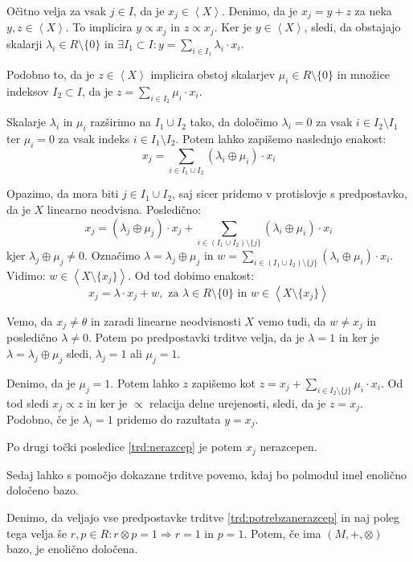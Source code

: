 \documentclass[mat1]{fmfdelo}
\newcommand{\Gen}[1]{\ensuremath{\left<{#1}\right>}}
\begin{document}
\begin{dokaz}
	Očitno velja za vsak $j\in I$, da je $x_j\in\Gen{X}$. Denimo, da je $x_j = y + z$ za neka $y, z\in\Gen{X}$. To implicira $y\varpropto x_j$ in $z\varpropto x_j$. 
	Ker je $y\in\Gen{X}$, sledi, da obstajajo skalarji $\lambda_i\in R\setminus\{0\}$ in $\exists I_1 \subset I: y = \sum_{i \in I_1}\lambda_i\cdot x_i$. 
	
	Podobno to, da je $z\in\Gen{X}$ implicira obstoj skalarjev $\mu_i\in R\setminus\{0\}$ in množice indeksov $I_2\subset I$, da je $z = \sum_{i\in I_2}\mu_i\cdot x_i$. 
	
	Skalarje $\lambda_i$ in $\mu_i$ razširimo na $I_1\cup I_2$ tako, da določimo $\lambda_i = 0$ za vsak $i\in I_2\setminus I_1$ ter $\mu_i = 0$ za vsak indeks $i\in I_1\setminus I_2$. Potem lahko zapišemo naslednjo enakost: $$x_j = \sum_{i\in I_1\cup I_2}(\lambda_i \oplus\mu_i)\cdot x_i$$
	
	Opazimo, da mora biti $j\in I_1\cup I_2$, saj sicer pridemo v protislovje s predpostavko, da je $X$ linearno neodvisna. Posledično: $$ x_j = (\lambda_j\oplus\mu_j)\cdot x_j + \sum_{i\in (I_1\cup I_2)\setminus\{j\}}(\lambda_i\oplus\mu_i)\cdot x_i $$
	kjer $\lambda_j\oplus\mu_j\neq 0$. Označimo $\lambda = \lambda_j\oplus\mu_j$ in $w = \sum_{i\in (I_1\cup I_2)\setminus\{j\}}(\lambda_i\oplus\mu_i)\cdot x_i$. Vidimo: $w\in\Gen{X\setminus\{x_j\}}$. Od tod dobimo enakost: $$x_j = \lambda\cdot x_j + w,\text{~za~} \lambda\in R\setminus\{0\}\text{~in~} w\in\Gen{X\setminus\{x_j\}} $$
	
	Vemo, da $x_j\neq \theta$ in zaradi linearne neodvisnosti $X$ vemo tudi, da $w\neq x_j$ in posledično $\lambda\neq 0$. Potem po predpostavki trditve velja, da je $\lambda = 1$ in ker je $\lambda = \lambda_j\oplus\mu_j$ sledi, $\lambda_j = 1$ ali $\mu_j = 1$. 
	
	Denimo, da je $\mu_j = 1$. Potem lahko $z$ zapišemo kot $z = x_j + \sum_{i\in I_2\setminus\{j\}}\mu_i\cdot x_i$. Od tod sledi $x_j\varpropto z$ in ker je $\varpropto$ relacija delne urejenosti, sledi, da je $z = x_j$. Podobno, če je $\lambda_i = 1$ pridemo do razultata $y = x_j$.
	
	Po drugi točki posledice \ref{trd:nerazcep} je potem $x_j$ nerazcepen.
\end{dokaz}

Sedaj lahko s pomočjo dokazane trditve povemo, kdaj bo polmodul imel enolično določeno bazo.

\begin{trditev}
	\label{trd:enoličbaza}
	Denimo, da veljajo vse predpostavke trditve \ref{trd:potrebzanerazcep} in naj poleg tega velja še $r, p\in R: r\otimes p = 1\Rightarrow r = 1$ in $p = 1$. Potem, če ima $(M, +, \otimes)$ bazo, je enolično določena.
\end{trditev}
\end{document}
